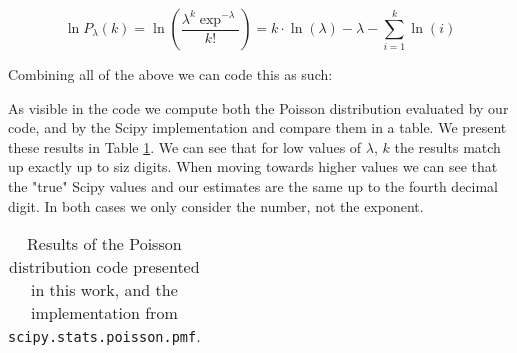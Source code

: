 \begin{equation}
    \ln P_{\lambda}(k) = \ln\left(\frac{\lambda^{k}\exp^{-\lambda}}{k!}\right) = k \cdot \ln(\lambda) - \lambda - \sum_{i=1}^{k} \ln(i)
\end{equation}

Combining all of the above we can code this as such:



As visible in the code we compute both the Poisson distribution evaluated by our code, and by the Scipy implementation and compare them in a table. We present these results in Table \ref{tab:poisson_results}. We can see that for low values of $\lambda$, $k$ the results match up exactly up to siz digits. When moving towards higher values we can see that the "true" Scipy values and our estimates are the same up to the fourth decimal digit. In both cases we only consider the number, not the exponent.

\begin{table}[h]
    \centering
    \begin{tabular}{c|c|c|c}
        \hline
        
    \end{tabular}
    \caption{Results of the Poisson distribution code presented in this work, and the implementation from \texttt{scipy.stats.poisson.pmf}.}
    \label{tab:poisson_results}
\end{table}


